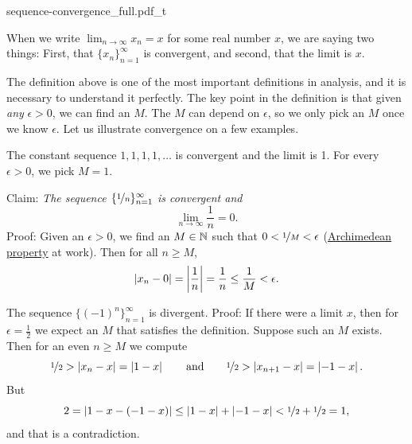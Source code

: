 \begin{myfigureht}
{sequence-convergence_full.pdf_t}
\caption{Illustration of convergence.
On top, we show the first ten points of the sequence as a graph
with $M$ and the interval around the limit $x$ marked.
On bottom, the points of the same sequence are marked on the
number line.\label{figsequenceconvergence}}
\end{myfigureht}

When we write $\lim_{n\to\infty} x_n = x$ for some real number $x$, we are saying two
things: First, that $\{ x_n \}_{n=1}^\infty$ is convergent, and second, that the limit is
$x$.

The definition above is one of the most important definitions in analysis,
and it is necessary to understand it perfectly.  The key point in the
definition is that given \emph{any} $\epsilon > 0$, we can find an $M$.  The
$M$ can depend on $\epsilon$, so we only pick an $M$ once we know
$\epsilon$.  Let us illustrate convergence on a few examples.

\begin{example}
The constant sequence $1,1,1,1,\ldots$ is convergent and the limit is 1.  For
every $\epsilon > 0$, we pick $M = 1$.
\end{example}

\begin{example}
Claim: \emph{The sequence $\{ \nicefrac{1}{n} \}_{n=1}^\infty$ is convergent and}
\begin{equation*}
\lim_{n\to \infty} \frac{1}{n} = 0 .
\end{equation*}
Proof: Given an $\epsilon > 0$, we find an $M \in {\mathbb{N}}$ such that
$0 < \nicefrac{1}{M} < \epsilon$
(\hyperref[thm:arch:i]{Archimedean property} at work).
Then for all $n \geq M$,
\begin{equation*}
\left\lvert {x_n - 0} \right\rvert = \left\lvert {\frac{1}{n}} \right\rvert = \frac{1}{n} \leq \frac{1}{M} < \epsilon .
\end{equation*}
\end{example}

\begin{example}
The sequence $\bigl\{ {(-1)}^n \bigr\}_{n=1}^\infty$ is divergent.  Proof: If there
were a limit $x$, then for $\epsilon = \frac{1}{2}$ we expect an $M$ that
satisfies the definition.  Suppose
such an $M$ exists.
Then for an even $n \geq M$ we compute
\begin{equation*}
\nicefrac{1}{2} > \left\lvert {x_n - x} \right\rvert  = \left\lvert {1 - x} \right\rvert
\qquad \text{and} \qquad
\nicefrac{1}{2} > \left\lvert {x_{n+1} - x} \right\rvert  = \left\lvert {-1 - x} \right\rvert .
\end{equation*}
But
\begin{equation*}
2 = \left\lvert {1 - x - (-1 -x)} \right\rvert \leq
\left\lvert {1 - x} \right\rvert + \left\lvert {-1 -x} \right\rvert < \nicefrac{1}{2} + \nicefrac{1}{2} = 1 ,
\end{equation*}
and that is a contradiction.
\end{example}

